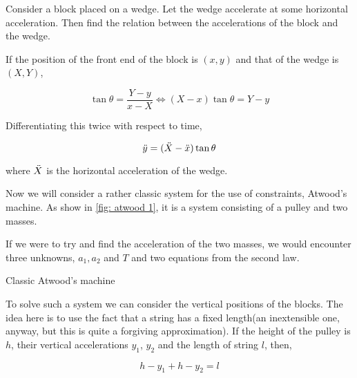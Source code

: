 \begin{example}
Consider a block placed on a wedge. Let the wedge accelerate 
at some horizontal acceleration. Then find the relation between the accelerations 
of the block and the wedge.

\begin{soln}
    If the position of the front end of the block is 
    \((x,y)\) and that of the wedge is \((X, Y)\), 

    \begin{equation*}
        \tan\theta = \frac{Y-y}{x - X} \iff (X - x)\tan\theta = Y - y
    \end{equation*}

    Differentiating this twice with respect to time, 

    \begin{equation}
        \ddot{y} = (\ddot{X} - \ddot{x}) \tan\theta
    \end{equation}

    where \(\ddot{X}\) is the horizontal acceleration of the wedge.
\end{soln}
\end{example}

\begin{marginfigure}
\end{marginfigure}

Now we will consider a rather classic system for the use of constraints,
Atwood's machine. As show in \cref{fig: atwood 1}, it is a system consisting of a pulley 
and two masses. 

If we were to try and find the acceleration of the two masses, we would encounter 
three unknowns, \(a_1, a_2\) and \(T\) and two equations from the second law.

\begin{marginfigure}
    \caption{Classic Atwood's machine}
    \label{fig: atwood 1}
\end{marginfigure}

To solve such a system we can consider the vertical positions of the blocks. The idea 
here is to use the fact that a string has a fixed length(an inextensible one, anyway, but 
this is quite a forgiving approximation). If the height of the pulley is \(h\), 
their vertical accelerations \(y_1\), \(y_2\) and the length of string \(l\), then,

\begin{equation*}
    h - y_1 + h - y_2 = l
\end{equation*}

